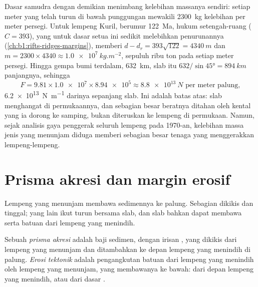 Dasar samudra dengan demikian menimbang kelebihan massanya sendiri: setiap meter yang telah turun
di bawah punggungan mewakili \qty{2300}{kg} kelebihan per meter persegi.
Untuk lempeng Kuril, berumur \qty{122}{Ma}, hukum setengah-ruang ($C = 393$), yang untuk dasar
setua ini sedikit melebihkan penurunannya (\cref{ch:b1:rifts-ridges-margins}),
memberi $d - d_r = 393\sqrt{122} = \qty{4340}{m}$ dan
$m = 2300\times4340 \approx \qty{1.0e7}{kg.m^{-2}}$, sepuluh ribu ton pada setiap meter persegi.
Hingga gempa bumi terdalam, \qty{632}{km}, slab itu
$632/\sin\ang{45} = \qty{894}{km}$ panjangnya, sehingga
\[
  F = 9.81 \times \num{1.0e7} \times \num{8.94e5} \approx \qty{8.8e13}{N}
  \text{ per meter palung},
\]
\qty{6.2e13}{N.m^{-1}} darinya sepanjang slab. Ini adalah batas atas: slab menghangat di permukaannya, dan sebagian besar beratnya ditahan oleh  kental yang ia dorong ke samping, bukan diteruskan ke lempeng di permukaan. Namun, sejak analisis gaya penggerak seluruh lempeng pada 1970-an, kelebihan massa jenis  yang menunjam diduga memberi sebagian besar tenaga yang menggerakkan lempeng-lempeng.

\section{Prisma akresi dan margin erosif}\label{sec:b1:active-margins:prisms}

Lempeng yang menunjam membawa sedimennya ke palung. Sebagian dikikis dan tinggal; yang lain ikut turun bersama slab, dan slab bahkan dapat membawa serta batuan dari lempeng yang menindih.

\begin{definition}\label{def:b1:active-margins:accretionary}
Sebuah \emph{prisma akresi} adalah baji sedimen, dengan irisan , yang dikikis dari lempeng yang menunjam dan ditambahkan ke depan lempeng yang menindih di palung. \emph{Erosi tektonik} adalah pengangkutan batuan dari lempeng yang menindih oleh lempeng yang menunjam, yang membawanya ke bawah: dari depan lempeng yang menindih, atau dari dasar .
\end{definition}

